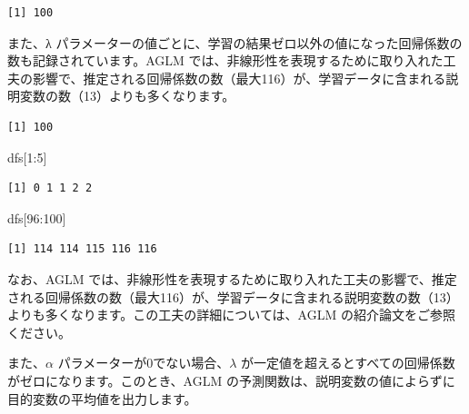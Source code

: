 \documentclass[
  letterpaper,
  DIV=11,
  numbers=noendperiod]{scrreprt}
\newenvironment{Shaded}{\begin{snugshade}}{\end{snugshade}}
\newcommand{\DecValTok}[1]{\textcolor[rgb]{0.68,0.00,0.00}{#1}}
\newcommand{\FunctionTok}[1]{\textcolor[rgb]{0.28,0.35,0.67}{#1}}
\newcommand{\NormalTok}[1]{\textcolor[rgb]{0.00,0.23,0.31}{#1}}
\newcommand{\OtherTok}[1]{\textcolor[rgb]{0.00,0.23,0.31}{#1}}
\newcommand{\SpecialCharTok}[1]{\textcolor[rgb]{0.37,0.37,0.37}{#1}}
\begin{document}
\begin{verbatim}
[1] 100
\end{verbatim}

また、λ
パラメーターの値ごとに、学習の結果ゼロ以外の値になった回帰係数の数も記録されています。AGLM
では、非線形性を表現するために取り入れた工夫の影響で、推定される回帰係数の数（最大116）が、学習データに含まれる説明変数の数（13）よりも多くなります。

\begin{Shaded}
\end{Shaded}

\begin{verbatim}
[1] 100
\end{verbatim}

\begin{Shaded}
\begin{Highlighting}[]
\NormalTok{dfs[}\DecValTok{1}\SpecialCharTok{:}\DecValTok{5}\NormalTok{]}
\end{Highlighting}
\end{Shaded}

\begin{verbatim}
[1] 0 1 1 2 2
\end{verbatim}

\begin{Shaded}
\begin{Highlighting}[]
\NormalTok{dfs[}\DecValTok{96}\SpecialCharTok{:}\DecValTok{100}\NormalTok{]}
\end{Highlighting}
\end{Shaded}

\begin{verbatim}
[1] 114 114 115 116 116
\end{verbatim}

なお、AGLM
では、非線形性を表現するために取り入れた工夫の影響で、推定される回帰係数の数（最大116）が、学習データに含まれる説明変数の数（13）よりも多くなります。この工夫の詳細については、AGLM
の紹介論文をご参照ください。

また、\(\alpha\) パラメーターが0でない場合、\(\lambda\)
が一定値を超えるとすべての回帰係数がゼロになります。このとき、AGLM
の予測関数は、説明変数の値によらずに目的変数の平均値を出力します。
\end{document}
